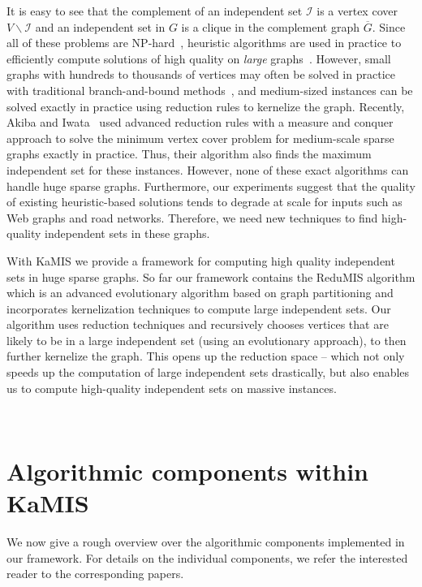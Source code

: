 \documentclass[11pt]{article}
\begin{document}
It is easy to see that the complement of an independent set $\mathcal{I}$ is a vertex cover $V \backslash \mathcal{I}$ and an independent set in $G$ is a clique in the complement graph $\overline{G}$. 
Since all of these problems are NP-hard~\cite{DBLP:books/fm/GareyJ79}, heuristic
algorithms are used in practice to efficiently compute solutions of high quality on \emph{large} graphs~\cite{AndradeRW12,grosso2008simple}. However, small graphs with hundreds to thousands of vertices may often be solved in practice with traditional branch-and-bound methods~\cite{segundo-recoloring,segundo-bitboard-2011,tomita-recoloring}, and medium-sized instances can be solved exactly in practice using reduction rules to kernelize the graph. Recently, Akiba and Iwata~\cite{akiba-2015} used advanced reduction rules with a measure and conquer approach to solve the minimum vertex cover problem for medium-scale sparse graphs exactly in practice. Thus, their algorithm also finds the maximum independent set for these instances.  
However, none of these exact algorithms can handle huge sparse graphs. Furthermore, our experiments suggest that the quality of existing heuristic-based solutions tends to degrade at scale for inputs such as Web graphs and road networks. Therefore, we need new techniques to find high-quality independent sets in these graphs.

With KaMIS we provide a framework for computing high quality independent sets in huge sparse graphs.
So far our framework contains the ReduMIS algorithm which is an advanced evolutionary algorithm based on graph partitioning and incorporates kernelization techniques to compute large independent sets. 
Our algorithm uses reduction techniques and recursively chooses vertices that are likely to be in a large independent set (using an evolutionary approach), to then further kernelize the graph. 
This opens up the reduction space -- which not only speeds up the computation of large independent sets drastically, but also enables us to compute high-quality independent sets on massive instances. 

\vfill
\pagebreak
\,
\pagebreak

\section{Algorithmic components within KaMIS}
We now give a rough overview over the algorithmic components implemented in our framework. For details on the individual components, we refer the interested reader to the corresponding papers. 
\end{document}
